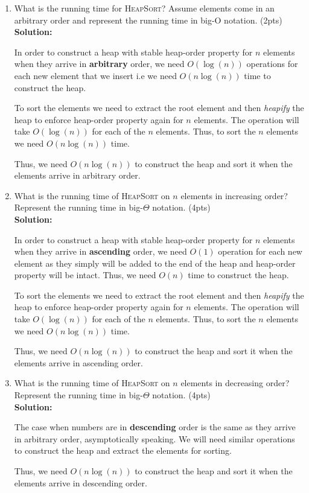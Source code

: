 \documentclass[11pt]{article}
\begin{document}
\begin{enumerate}
\item What is the running time for \textsc{HeapSort}? Assume elements come in an arbitrary order and represent the running time in big-O notation. (2pts) \\
\textbf{Solution:} 

In order to construct a heap with stable heap-order property for $ n $ elements when they arrive in \textbf{arbitrary} order, we need $O(\log(n))$ operations for each new element that we insert i.e we need $O(n\log(n))$ time to construct the heap.

To sort the elements we need to extract the root element and then \textit{heapify} the heap to enforce heap-order property again for $ n $ elements. The operation will take $O(\log(n))$ for each of the $ n $ elements. Thus, to sort the $ n $ elements we need $O(n\log(n))$ time.

Thus, we need $ O(n\log(n)) $ to construct the heap and sort it when the elements arrive in arbitrary order. \\

\item What is the running time of \textsc{HeapSort} on $n$ elements in increasing order? Represent the running time in big-$\Theta$ notation. (4pts) \\
\textbf{Solution:} 

In order to construct a heap with stable heap-order property for $ n $ elements when they arrive in \textbf{ascending} order, we need $O(1)$ operation for each new element as they simply will be added to the end of the heap and heap-order property will be intact. Thus, we need $O(n)$ time to construct the heap.

To sort the elements we need to extract the root element and then \textit{heapify} the heap to enforce heap-order property again for $ n $ elements. The operation will take $O(\log(n))$ for each of the $ n $ elements. Thus, to sort the $ n $ elements we need $O(n\log(n))$ time.

Thus, we need $ O(n\log(n)) $ to construct the heap and sort it when the elements arrive in ascending order. \\

\item What is the running time of \textsc{HeapSort} on $n$ elements in decreasing order?  Represent the running time in big-$\Theta$ notation. (4pts) \\
\textbf{Solution:} 

The case when numbers are in \textbf{descending} order is the same as they arrive in arbitrary order, asymptotically speaking. We will need similar operations to construct the heap and extract the elements for sorting.

Thus, we need $ O(n\log(n)) $ to construct the heap and sort it when the elements arrive in descending order. \\
\end{enumerate}
\end{document}
